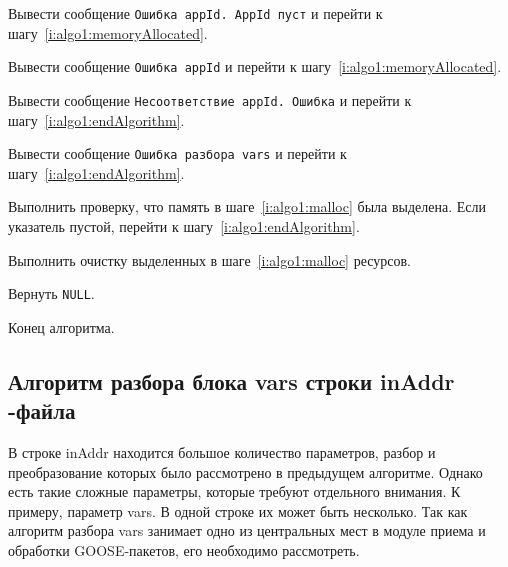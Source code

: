 \begin{enumerate_step}
    \item \label{i:algo1:appIdEmpty} Вывести сообщение \texttt{Ошибка appId. AppId пуст} и перейти к шагу~\ref{i:algo1:memoryAllocated}.
    \item \label{i:algo1:appIdError} Вывести сообщение \texttt{Ошибка appId} и перейти к шагу~\ref{i:algo1:memoryAllocated}.
    \item \label{i:algo1:mismatchAppId} Вывести сообщение \texttt{Несоответствие appId. Ошибка} и перейти к шагу~\ref{i:algo1:endAlgorithm}.
    \item \label{i:algo1:errorVars} Вывести сообщение \texttt{Ошибка разбора vars} и перейти к шагу~\ref{i:algo1:endAlgorithm}.

    \item \label{i:algo1:memoryAllocated} Выполнить проверку, что память в шаге~\ref{i:algo1:malloc} была выделена. Если указатель пустой, перейти к шагу~\ref{i:algo1:endAlgorithm}.
    \item Выполнить очистку выделенных в шаге~\ref{i:algo1:malloc} ресурсов.

    \item \label{i:algo1:endAlgorithm} Вернуть \lstinline{NULL}.
    \item \label{i:algo1:end} Конец алгоритма.
\end{enumerate_step}

\subsection{Алгоритм разбора блока vars строки inAddr \cid-файла}
\label{ssec:algo:varsInAddr}

В строке inAddr находится большое количество параметров, разбор и преобразование которых было рассмотрено в предыдущем алгоритме. Однако есть такие сложные параметры, которые требуют отдельного внимания. К примеру, параметр vars. В одной строке их может быть несколько. Так как алгоритм разбора vars занимает одно из центральных мест в модуле приема и обработки GOOSE-пакетов, его необходимо рассмотреть.

